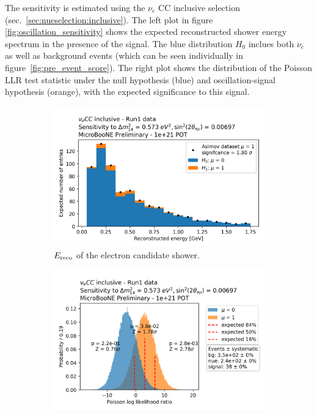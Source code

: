 \documentclass[a4paper]{article}
\begin{document}
The sensitivity is estimated using the $\nu_e$ CC inclusive selection (sec.~\ref{sec:nueselection:inclusive}).
The left plot in figure \ref{fig:oscillation_sensitivity} shows the expected reconstructed shower energy spectrum in the presence of the signal. The blue distribution $H_0$ inclues both $\nu_e$ as well as background events (which can be seen individually in figure~\ref{fig:pre_event_score}).
The right plot shows the distribution of the Poisson LLR test statistic under the null hypothesis (blue) and oscillation-signal hypothesis (orange), with the expected significance to this signal.

\begin{figure}[ht] 
\begin{center}
    \begin{subfigure}[b]{0.45\textwidth}
    \centering
    \includegraphics[width=1.00\textwidth]{Sensitivity/oscillation/pois_llr_asimov_plot_1e+21_deltam2_0573_sin2theta2_000697.png}
    \caption{$E_{\rm reco}$ of the electron candidate shower.}
    \end{subfigure}
    \begin{subfigure}[b]{0.45\textwidth}
    \centering
    \includegraphics[width=1.00\textwidth]{Sensitivity/oscillation/pois_llr_discovery_totalpot_1e+21_nosyst_deltam2_0573_sin2theta2_000697.png}

\end{subfigure}
\end{center}
\end{figure}
\end{document}
